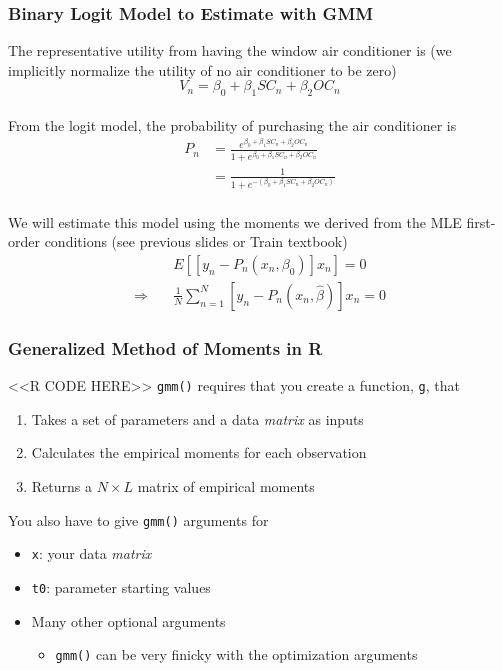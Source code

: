 \documentclass{beamer}
\begin{document}
\begin{frame}\frametitle{Binary Logit Model to Estimate with GMM}
    The representative utility from having the window air conditioner is (we implicitly normalize the utility of no air conditioner to be zero)
    $$V_n = \beta_0 + \beta_1 SC_n + \beta_2 OC_n$$ \\
    \vspace{2ex}
    From the logit model, the probability of purchasing the air conditioner is
    \begin{align*}
        P_n &= \frac{e^{\beta_0 + \beta_1 SC_n + \beta_2 OC_n}}{1 + e^{\beta_0 + \beta_1 SC_n + \beta_2 OC_n}} \\
        &= \frac{1}{1 + e^{-(\beta_0 + \beta_1 SC_n + \beta_2 OC_n)}}
    \end{align*} \\
    \vspace{2ex}
    We will estimate this model using the moments we derived from the MLE first-order conditions (see previous slides or Train textbook)
    \begin{align*}
        &E[[y_n - P_n(x_n, \beta_0)] x_n] = 0 \\
        \Rightarrow \quad &\frac{1}{N} \sum_{n = 1}^N [y_n - P_n(x_n, \hat{\beta})] x_n = 0
    \end{align*}
\end{frame}

\begin{frame}[fragile]\frametitle{Generalized Method of Moments in R}
    <<R CODE HERE>>
    \texttt{gmm()} requires that you create a function, \texttt{g}, that
    \begin{enumerate}
        \item Takes a set of parameters and a data \emph{matrix} as inputs
        \item Calculates the empirical moments for each observation
        \item Returns a $N \times L$ matrix of empirical moments
    \end{enumerate}
    You also have to give \texttt{gmm()} arguments for
    \begin{itemize}
        \item \texttt{x}: your data \emph{matrix}
        \item \texttt{t0}: parameter starting values
        \item Many other optional arguments
        \begin{itemize}
            \item \texttt{gmm()} can be very finicky with the optimization arguments
        \end{itemize}
    \end{itemize}
\end{frame}
\end{document}
